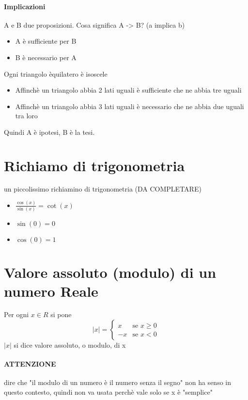 \documentclass[12pt, a4paper, openany]{book}
\newcommand{\definizione}[1]{\begin{box_definizione} #1 \end{box_definizione}}
\begin{document}
\paragraph*{Implicazioni}
A e B due proposizioni. Cosa significa A -> B? (a implica b)
\begin{itemize}
    \item A è sufficiente per B
    \item B è necessario per A
\end{itemize}
Ogni triangolo èquilatero è isoscele
\begin{itemize}
    \item Affinchè un triangolo abbia 2 lati uguali è sufficiente che ne abbia tre uguali
    \item Affinchè un triangolo abbia 3 lati uguali è necessario che ne abbia due uguali tra loro
\end{itemize}
Quindi A è ipotesi, B è la tesi.

\section{Richiamo di trigonometria}
un piccolissimo richiamino di trigonometria (DA COMPLETARE)
\begin{itemize}
    \item $\frac{\cos(x)}{\sin(x)} = \cot(x)$
    \item $\sin(0) = 0$
    \item $\cos(0) = 1$
\end{itemize}

\section{Valore assoluto (modulo) di un numero Reale}

\definizione{ Per ogni $x \in R$ si pone
\begin{equation}
    |x| = \begin{cases}
        x & \text{se $x \geq 0$}\\
        -x & \text{se $x < 0$}
    \end{cases}
\end{equation}
$|x|$ si dice valore assoluto, o modulo, di x
}
\paragraph{ATTENZIONE} dire che "il modulo di un numero è il numero senza il segno" non ha senso in questo contesto, quindi non va usata perchè vale solo se x è "semplice"
\end{document}
